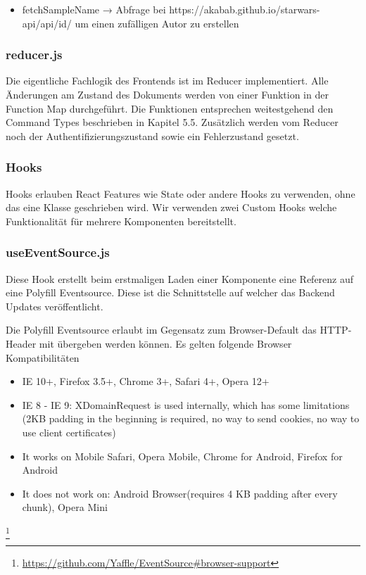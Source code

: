 \begin{itemize}
    \item fetchSampleName → Abfrage bei https://akabab.github.io/starwars-api/api/id/ um einen zufälligen Autor zu erstellen
\end{itemize}

\subsubsection*{reducer.js}
Die eigentliche Fachlogik des Frontends ist im Reducer implementiert.
Alle Änderungen am Zustand des Dokuments werden von einer Funktion in der Function Map durchgeführt.
Die Funktionen entsprechen weitestgehend den Command Types beschrieben in Kapitel 5.5.
Zusätzlich werden vom Reducer noch der Authentifizierungszustand sowie ein Fehlerzustand gesetzt.

\subsubsection{Hooks}
Hooks erlauben React Features wie State oder andere Hooks zu verwenden, ohne das eine Klasse geschrieben wird.
Wir verwenden zwei Custom Hooks welche Funktionalität für mehrere Komponenten bereitstellt.

\subsubsection*{useEventSource.js}
Diese Hook erstellt beim erstmaligen Laden einer Komponente eine Referenz auf eine Polyfill Eventsource.
Diese ist die Schnittstelle auf welcher das Backend Updates veröffentlicht.

Die Polyfill Eventsource erlaubt im Gegensatz zum Browser-Default das HTTP-Header mit übergeben werden können.
Es gelten folgende Browser Kompatibilitäten

\begin{itemize}
    \item IE 10+, Firefox 3.5+, Chrome 3+, Safari 4+, Opera 12+
    \item IE 8 - IE 9: XDomainRequest is used internally, which has some limitations (2KB padding in the beginning is required, no way to send cookies, no way to use client certificates)
    \item It works on Mobile Safari, Opera Mobile, Chrome for Android, Firefox for Android
    \item It does not work on: Android Browser(requires 4 KB padding after every chunk), Opera Mini
\end{itemize}
\footnote{\url{https://github.com/Yaffle/EventSource#browser-support}}

